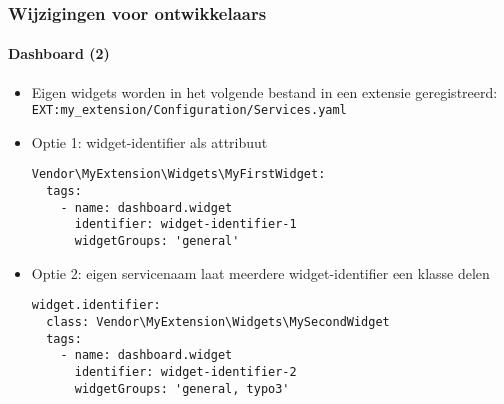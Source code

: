 
\begin{frame}[fragile]
	\frametitle{Wijzigingen voor ontwikkelaars}
	\framesubtitle{Dashboard (2)}

	\lstset{basicstyle=\tiny\ttfamily}

	\begin{itemize}
		\item Eigen widgets worden in het volgende bestand in een extensie geregistreerd:\newline
			\texttt{EXT:my\_extension/Configuration/Services.yaml}

		\item Optie 1: widget-identifier als attribuut

\vspace{-0.4cm}
\begin{lstlisting}
Vendor\MyExtension\Widgets\MyFirstWidget:
  tags:
    - name: dashboard.widget
      identifier: widget-identifier-1
      widgetGroups: 'general'
\end{lstlisting}

		\item Optie 2: eigen servicenaam laat meerdere widget-identifier een klasse delen

\vspace{-0.4cm}
\begin{lstlisting}
widget.identifier:
  class: Vendor\MyExtension\Widgets\MySecondWidget
  tags:
    - name: dashboard.widget
      identifier: widget-identifier-2
      widgetGroups: 'general, typo3'
\end{lstlisting}

	\end{itemize}

\end{frame}


